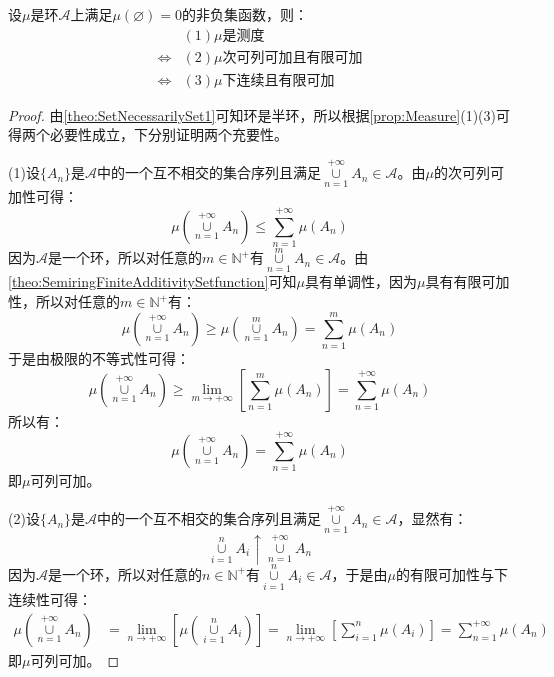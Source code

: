 \begin{theorem}
	设$\mu$是环$\mathscr{A}$上满足$\mu(\varnothing)=0$的非负集函数，则：
	\begin{align*}
		&(1)\mu\text{是测度} \\
		\Leftrightarrow&(2)\mu\text{次可列可加且有限可加} \\
		\Leftrightarrow&(3)\mu\text{下连续且有限可加}
	\end{align*}
\end{theorem}
\begin{proof}
	由\cref{theo:SetNecessarilySet1}可知环是半环，所以根据\cref{prop:Measure}(1)(3)可得两个必要性成立，下分别证明两个充要性。\par
	(1)设$\{A_n\}$是$\mathscr{A}$中的一个互不相交的集合序列且满足$\underset{n=1}{\overset{+\infty}{\cup}}A_n\in\mathscr{A}$。由$\mu$的次可列可加性可得：
	\begin{equation*}
		\mu\left(\underset{n=1}{\overset{+\infty}{\cup}}A_n\right)\leqslant
		\sum_{n=1}^{+\infty}\mu(A_n)
	\end{equation*}
	因为$\mathscr{A}$是一个环，所以对任意的$m\in\mathbb{N}^+$有$\underset{n=1}{\overset{m}{\cup}}A_n\in\mathscr{A}$。由\cref{theo:SemiringFiniteAdditivitySetfunction}可知$\mu$具有单调性，因为$\mu$具有有限可加性，所以对任意的$m\in\mathbb{N}^+$有：
	\begin{equation*}
		\mu\left(\underset{n=1}{\overset{+\infty}{\cup}}A_n\right)\geqslant\mu\left(\underset{n=1}{\overset{m}{\cup}}A_n\right)=\sum_{n=1}^{m}\mu(A_n)
	\end{equation*}
	于是由极限的不等式性可得：
	\begin{equation*}
		\mu\left(\underset{n=1}{\overset{+\infty}{\cup}}A_n\right)\geqslant\lim_{m\to+\infty}\left[\sum_{n=1}^{m}\mu(A_n)\right]=
		\sum_{n=1}^{+\infty}\mu(A_n)
	\end{equation*}
	所以有：
	\begin{equation*}
		\mu\left(\underset{n=1}{\overset{+\infty}{\cup}}A_n\right)=\sum_{n=1}^{+\infty}\mu(A_n)
	\end{equation*}
	即$\mu$可列可加。\par
	(2)设$\{A_n\}$是$\mathscr{A}$中的一个互不相交的集合序列且满足$\underset{n=1}{\overset{+\infty}{\cup}}A_n\in\mathscr{A}$，显然有：
	\begin{equation*}
		\underset{i=1}{\overset{n}{\cup}}A_i\uparrow\underset{n=1}{\overset{+\infty}{\cup}}A_n
	\end{equation*}
	因为$\mathscr{A}$是一个环，所以对任意的$n\in\mathbb{N}^+$有$\underset{i=1}{\overset{n}{\cup}}A_i\in\mathscr{A}$，于是由$\mu$的有限可加性与下连续性可得：
	\begin{align*}
		\mu\left(\underset{n=1}{\overset{+\infty}{\cup}}A_n\right)
		&=\lim_{n\to+\infty}\left[\mu\left(\underset{i=1}{\overset{n}{\cup}}A_i\right)\right] =\lim_{n\to+\infty}\left[\sum_{i=1}^{n}\mu(A_i)\right]=\sum_{n=1}^{+\infty}\mu(A_n)
	\end{align*}
	即$\mu$可列可加。
\end{proof}
